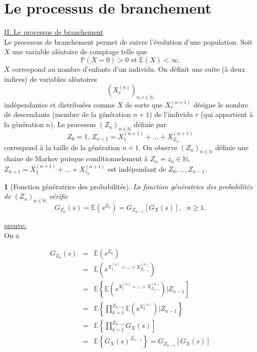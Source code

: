 \documentclass[8pt,notheorems]{beamer}
\def \E{\mathbb E}
\def \N{\mathbb N}
\def \P {\mathbb P}
\newtheorem{prop}{\translate{Proposition}}
\theoremstyle{definition}
\theoremstyle{example}
\theoremstyle{mystyle}
\theoremstyle{plain}
\begin{document}
\section{Le processus de branchement}
\begin{frame}[allowframebreaks]
\underline{II. Le processus de branchement}\\

Le processus de branchement permet de suivre l'évolution d'une population. Soit $X$ une variable aléatoire de comptage telle que
$$
\P(X = 0)>0\text{ et }\E(X)<\infty.
$$
$X$ correspond au nombre d'enfants d'un individu. On définit une suite (à deux indices) de variables aléatoires
$$
\left(X^{(n)}_r\right)_{n,r\in \N}
$$ 
indépendantes et distribuées comme $X$ de sorte que $X^{(n+1)}_r$ désigne le nombre de descendants (membre de la génération $n+1$) de l'individu $r$ (qui appartient à la génération $n$). Le processus $(Z_n)_{n\in \N}$ définie par 
$$
Z_0 =1\text{, }Z_{n+1} = X^{(n+1)}_1+\ldots+ X^{(n+1)}_{Z_n} 
$$
correspond à la taille de la génération $n+1$. On observe $(Z_n)_{n\in\N}$ définie une chaine de Markov puisque conditionnelement à $Z_n = z_n\in \N$, $Z_{n+1}=X^{(n+1)}_1+\ldots+ X^{(n+1)}_{z_n}$ est indépendant de $Z_0,\ldots, Z_{n-1}$. 
\begin{prop}[Fonction génératrice des probabilités]
La fonction génératrice des probabilités de $(Z_n)_{n\in\N}$ vérifie
$$
G_{Z_n}(s) = \E\left(s^{Z_n}\right) = G_{Z_{n-1}}\left[G_X(s)\right],\text{ }n\geq1.
$$
\end{prop} 
\underline{preuve:}\\
On a

\begin{eqnarray*}
G_{Z_n}(s) &=& \E\left(s^{Z_n}\right)\\
&=& \E\left(s^{X_1^{(n)}+\ldots+ X_{Z_{n-1}}^{(n)}}\right)\\
&=& \E\left\{\E\left(s^{X_1^{(n)}+\ldots+ X_{Z_{n-1}}^{(n)}}\right)\Big\rvert Z_{n-1}\right]\\
&=& \E\left\{\prod_{k=1}^{Z_{n-1}}\E\left(s^{X_k^{(n)}}\right)\Big\rvert Z_{n-1}\right\}\\
&=& \E\left\{\prod_{k=1}^{Z_{n-1}}G_X(s)\right]\\
&=& \E\left\{G_X(s)^{Z_{n-1}}\right\} = G_{Z_{n-1}}\left[G_X(s)\right]
\end{eqnarray*}
\end{frame}
\end{document}
